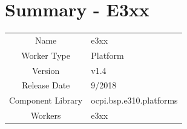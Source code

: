 \documentclass{article}
\author{} %
\date{Version \docVersion} %
\title{\docTitle}
\def\docVersion{1.4}
\def\comp{e3xx}
\def\Comp{e3xx Platform}
\def\comp{e3xx}
\def\Comp{E3xx}
\begin{document}
\section*{Summary - \Comp}
\begin{tabular}{|c|M{13.5cm}|}
	\hline
	                  &                                                    \\
	\hline
	Name              & \comp                                              \\
	\hline
	Worker Type       & Platform                                           \\
	\hline
	Version           & v\docVersion \\
	\hline
	Release Date      & 9/2018 \\
	\hline
	Component Library & ocpi.bsp.e310.platforms                                \\
	\hline
	Workers & \comp                                        \\
	\hline
\end{tabular}
\end{document}
